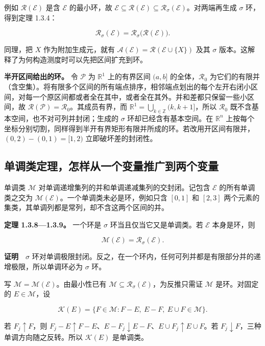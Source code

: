 \documentclass[11pt,a4paper]{article}
\begin{document}
例如 \(\mathcal R(\mathcal E)\) 是含 \(\mathcal E\) 的最小环，故 \(\mathcal E\subseteq\mathcal R(\mathcal E)\subseteq\mathcal R_\sigma(\mathcal E)\)。对两端再生成 \(\sigma\) 环，得到定理 1.3.4：

\[
\mathcal R_\sigma(\mathcal E)=\mathcal R_\sigma\bigl(\mathcal R(\mathcal E)\bigr).
\]

同理，把 \(X\) 作为附加生成元，就有 \(\mathcal A(\mathcal E)=\mathcal R(\mathcal E\cup\{X\})\) 及其 \(\sigma\) 版本。这解释了为何构造测度时可以先把区间扩充到环。

\textbf{半开区间给出的环。} 令 \(\mathcal P\) 为 \(\mathbb R^1\) 上的有界区间 \((a,b]\) 的全体，\(\mathcal R_0\) 为它们的有限并（含空集）。将有限多个区间的所有端点排序，相邻端点划出的每个左开右闭小区间，对每一个原区间都或者全在其中，或者全在其外。并和差都只保留一些小区间，故 \(\mathcal R(\mathcal P)=\mathcal R_0\)。其成员有界，而 \(\mathbb R^1=\bigcup_{k\in\mathbb Z}(k,k+1]\)，所以 \(\mathcal R_0\) 既不含基本空间，也不对可列并封闭；生成的 \(\sigma\) 环却已经含有基本空间。在 \(\mathbb R^n\) 上按每个坐标分别切割，同样得到半开有界矩形有限并所成的环。若改用开区间有限并，\((0,2)-(0,1)=[1,2)\) 立即破坏差的封闭性。

\subsection{单调类定理，怎样从一个变量推广到两个变量}

单调类 \(\mathcal M\) 对单调递增集列的并和单调递减集列的交封闭。记包含 \(\mathcal E\) 的所有单调类之交为 \(\mathcal M(\mathcal E)\)。一个单调类未必是环，例如只含 \([0,1]\) 和 \([2,3]\) 两个元素的集类，其单调列都是常列，却不含这两个区间的并。

\textbf{定理 1.3.8---1.3.9。} 一个环是 \(\sigma\) 环当且仅当它又是单调类。若 \(\mathcal E\) 本身是环，则

\[
\mathcal M(\mathcal E)=\mathcal R_\sigma(\mathcal E).
\]

\textbf{证明}　\(\sigma\) 环对单调极限封闭。反之，在一个环内，任何可列并都是有限部分并的递增极限，所以单调环必为 \(\sigma\) 环。

写 \(\mathcal M=\mathcal M(\mathcal E)\)。由最小性已有 \(\mathcal M\subseteq\mathcal R_\sigma(\mathcal E)\)，为反推只需证 \(\mathcal M\) 是环。对固定的 \(E\in\mathcal M\)，设

\[
\mathcal K(E)=\{F\in\mathcal M:F-E,\ E-F,\ E\cup F\in\mathcal M\}.
\]

若 \(F_j\uparrow F\)，则 \(F_j-E\uparrow F-E\)、\(E-F_j\downarrow E-F\)、\(E\cup F_j\uparrow E\cup F\)。若 \(F_j\downarrow F\)，三种单调方向随之反转。所以 \(\mathcal K(E)\) 是单调类。
\end{document}
